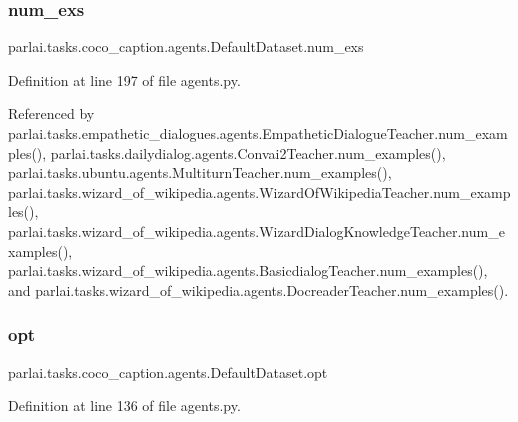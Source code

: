 \subsubsection{\texorpdfstring{num\+\_\+exs}{num\_exs}}
{\footnotesize\ttfamily parlai.\+tasks.\+coco\+\_\+caption.\+agents.\+Default\+Dataset.\+num\+\_\+exs}



Definition at line 197 of file agents.\+py.



Referenced by parlai.\+tasks.\+empathetic\+\_\+dialogues.\+agents.\+Empathetic\+Dialogue\+Teacher.\+num\+\_\+examples(), parlai.\+tasks.\+dailydialog.\+agents.\+Convai2\+Teacher.\+num\+\_\+examples(), parlai.\+tasks.\+ubuntu.\+agents.\+Multiturn\+Teacher.\+num\+\_\+examples(), parlai.\+tasks.\+wizard\+\_\+of\+\_\+wikipedia.\+agents.\+Wizard\+Of\+Wikipedia\+Teacher.\+num\+\_\+examples(), parlai.\+tasks.\+wizard\+\_\+of\+\_\+wikipedia.\+agents.\+Wizard\+Dialog\+Knowledge\+Teacher.\+num\+\_\+examples(), parlai.\+tasks.\+wizard\+\_\+of\+\_\+wikipedia.\+agents.\+Basicdialog\+Teacher.\+num\+\_\+examples(), and parlai.\+tasks.\+wizard\+\_\+of\+\_\+wikipedia.\+agents.\+Docreader\+Teacher.\+num\+\_\+examples().

\mbox{\label{classparlai_1_1tasks_1_1coco__caption_1_1agents_1_1DefaultDataset_adaa89b61b63ef4c1291774fda7abaf3c}} 
\subsubsection{\texorpdfstring{opt}{opt}}
{\footnotesize\ttfamily parlai.\+tasks.\+coco\+\_\+caption.\+agents.\+Default\+Dataset.\+opt}



Definition at line 136 of file agents.\+py.



